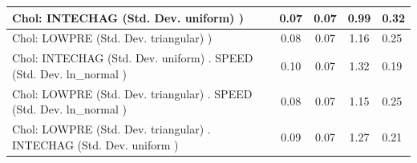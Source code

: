 \begin{table}
\begin{center}
\begin{tabular}{|l|l|c|c|c|l|}
			\hline
			 Chol: INTECHAG (Std. Dev. uniform) ) &  & 0.07 & 0.07 & 0.99 & 0.32 \\
			\hline
			 Chol: LOWPRE (Std. Dev. triangular) ) &  & 0.08 & 0.07 & 1.16 & 0.25 \\
			\hline
			 Chol: INTECHAG (Std. Dev. uniform) . SPEED (Std. Dev.   ln_normal ) &  & 0.10 & 0.07 & 1.32 & 0.19 \\
			\hline
			 Chol: LOWPRE (Std. Dev. triangular) . SPEED (Std. Dev.   ln_normal ) &  & 0.08 & 0.07 & 1.15 & 0.25 \\
			\hline
			 Chol: LOWPRE (Std. Dev. triangular) . INTECHAG (Std. Dev.   uniform ) &  & 0.09 & 0.07 & 1.27 & 0.21 \\
			\hline
		\end{tabular}
	\end{center}
\end{table}